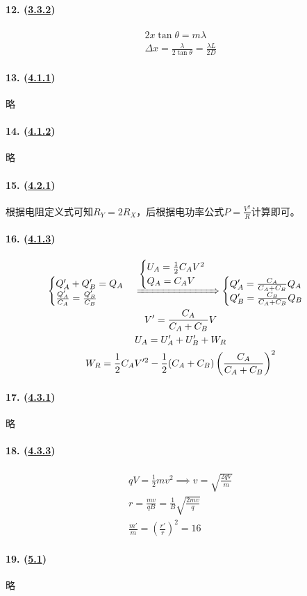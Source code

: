 \paragraph{12. (\hyperref[subsec:3.3.2]{3.3.2})}

\begin{gather*}
    2x\tan\theta=m\lambda\\
    \Delta x=\frac{\lambda}{2\tan\theta}=\frac{\lambda L}{2D}
\end{gather*}

\paragraph{13. (\hyperref[subsec:4.1.1]{4.1.1})} 略
\paragraph{14. (\hyperref[subsec:4.1.2]{4.1.2})} 略
\paragraph{15. (\hyperref[subsec:4.2.1]{4.2.1})} 根据电阻定义式可知$R_Y=2R_X$，后根据电功率公式$P=\frac{V^2}{R}$计算即可。
\paragraph{16. (\hyperref[subsec:4.1.3]{4.1.3})}

\begin{gather*}
    \begin{cases}
        Q_A'+Q_B'=Q_A\\
        \frac{Q_A'}{C_A}=\frac{Q_B'}{C_B}
    \end{cases}
    \xRightarrow{\begin{cases}
        U_A=\frac12C_AV^2\\
        Q_A=C_AV
    \end{cases}}
    \begin{cases}
        Q_A'=\frac{C_A}{C_A+C_B}Q_A\\
        Q_B'=\frac{C_B}{C_A+C_B}Q_B
    \end{cases}\\
    V'=\frac{C_A}{C_A+C_B}V\\
    U_A=U_A'+U_B'+W_R\\
    W_R=\frac12C_AV'^2-\frac12(C_A+C_B)\left(\frac{C_A}{C_A+C_B}\right)^2
\end{gather*}

\paragraph{17. (\hyperref[subsec:4.3.1]{4.3.1})} 略
\paragraph{18. (\hyperref[subsec:4.3.3]{4.3.3})}

\begin{gather*}
    qV=\frac12mv^2\implies v=\sqrt{\frac{2qV}{m}}\\
    r=\frac{mv}{qB}=\frac1B\sqrt{\frac{2mv}{q}}\\
    \frac{m'}{m}=\left(\frac{r'}{r}\right)^2=16
\end{gather*}

\paragraph{19. (\hyperref[sec:5.1]{5.1})} 略
